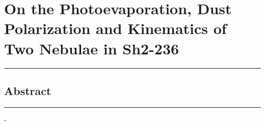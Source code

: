 \documentclass[../../mainNotes.tex]{subfiles}
\begin{document}
\pagebreak
\chapter{On the Photoevaporation, Dust Polarization and Kinematics of Two Nebulae in Sh2-236 \cite{soamPhotoevaporationDustPolarization2021}}
\hrule
\vspace{.5cm}

\section{Abstract}
\hrule
\vspace{.5cm}

\begin{list}{-}{}
\item 
\end{list}
\end{document}
